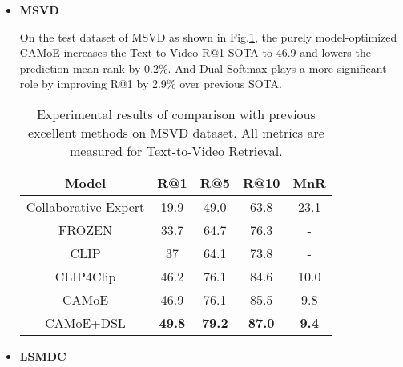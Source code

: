 \documentclass[letterpaper]{article} \usepackage{aaai22}  \usepackage{times}  \usepackage{helvet}  \usepackage{courier}  \usepackage[hyphens]{url}  \usepackage{graphicx} \urlstyle{rm} \def\UrlFont{\rm}  \usepackage{natbib}  \usepackage{caption}
\begin{document}
\begin{itemize}
Referring to Table.\ref{msrvtt_result}, firstly, we can conclude that the models based on CLIP usually perform better than others. It isn't surprising due to its powerful generalization ability after learning from massive data. The proposed CAMoE automatically parses the original single task into multi-tasks and surpasses previous SOTA in various metrics with a standard loss function. If adopting the Dual Softmax loss, it achieves a higher SOTA. The R@1 is of approximate 2.8\% and 6.4 \% increments, respectively. It's interesting that Dual Softmax loss imposes a more important effect on Video-to-Text than on Text-to-Video, which is consistent with our hypothesis that texts' descriptions can be unspecific and be matched with several videos. As shown in Fig.1 (in Appendix), the advantages of CAMoE mainly reflect on alleviating overfitting. The main reason is that the extra two match units provide more complicated but critical targets and prevent the model from falling into local optimum by learning unprofitable words.

    \item \textbf{MSVD}
    
    
On the test dataset of MSVD as shown in Fig.\ref{msvd_result}, the purely model-optimized CAMoE increases the Text-to-Video R@1 SOTA to 46.9 and lowers the prediction mean rank by 0.2\%. And Dual Softmax plays a more significant role by improving R@1 by 2.9\% over previous SOTA.

\begin{table}[h]
\centering
\caption{Experimental results of comparison with previous excellent methods on MSVD dataset. All metrics are measured for Text-to-Video Retrieval.}
\label{msvd_result}
\begin{tabular}{c|c|c|c|c}
\hline
Model &R@1  &R@5 &R@10 &MnR \\
\hline
Collaborative Expert &19.9 &49.0 &63.8 &23.1 \\
FROZEN &33.7 &64.7 &76.3 &- \\
CLIP &37 &64.1 &73.8 &- \\
CLIP4Clip &46.2 &76.1 &84.6 &10.0 \\
\hline
CAMoE &46.9 &76.1 &85.5 &9.8 \\
CAMoE+DSL &\textbf{49.8} &\textbf{79.2} &\textbf{87.0} &\textbf{9.4} \\
\hline
\end{tabular}
\end{table}

    \item \textbf{LSMDC}


\end{itemize}
\end{document}
